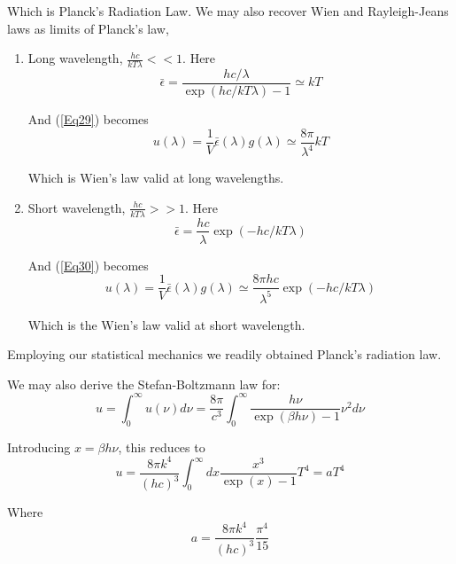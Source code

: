 \documentclass[book.tex]{subfiles}
\begin{document}
Which is Planck's Radiation Law.  We may also recover Wien and Rayleigh-Jeans laws as limits of Planck's law,
\begin{enumerate}
\item Long wavelength, $\frac{hc}{kT\lambda} << 1$. Here
\begin{equation}\label{Eq29}
\bar{\epsilon}= \frac{hc/\lambda}{\exp(hc/kT\lambda)-1} \simeq kT
\end{equation}

And (\ref{Eq29}) becomes
\begin{equation}\label{Eq30}
u(\lambda)= \frac{1}{V} \bar{\epsilon}(\lambda) g(\lambda) \simeq \frac{8 \pi}{\lambda^{4}} kT
\end{equation}

Which is Wien's law valid at long wavelengths.

\item Short wavelength, $\frac{hc}{kT\lambda} >> 1$. Here
\begin{equation}\label{Eq31}
\bar{\epsilon}= \frac{hc}{\lambda} \exp(-hc/kT\lambda)
\end{equation}

And (\ref{Eq30}) becomes
\begin{equation}\label{Eq32}
u(\lambda)= \frac{1}{V} \bar{\epsilon}(\lambda) g(\lambda) \simeq \frac{8 \pi hc}{\lambda^{5}} \exp(-hc/kT\lambda)
\end{equation}

Which is the Wien's law valid at short wavelength. 
\end{enumerate}

Employing our statistical mechanics we readily obtained Planck's radiation law. 

We may also derive the Stefan-Boltzmann law for:
\begin{equation}\label{Eq33}
u = \int_0^{\infty} u(\nu) d\nu = \frac{8\pi}{c^{3}} \int_0^{\infty} \frac{h\nu}{\exp(\beta h\nu)-1}\nu^{2}d\nu
\end{equation}

Introducing $x=\beta h\nu$, this reduces to
\begin{equation}\label{Eq34}
u = \frac{8\pi k^{4}}{(hc)^{3}} \int_0^{\infty} dx \frac{x^{3}}{\exp(x)-1} T^{4} = aT^{4}
\end{equation}

Where
\begin{equation}\label{Eq35}
a = \frac{8\pi k^{4}}{(hc)^{3}} \frac{\pi^{4}}{15}
\end{equation}
\end{document}
